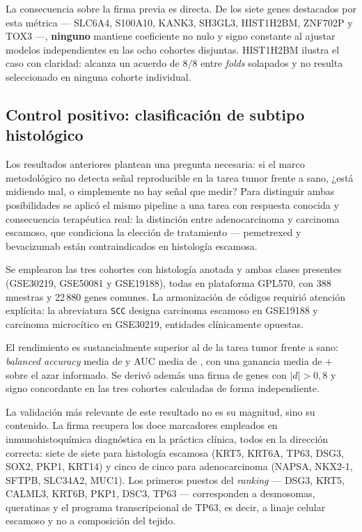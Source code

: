 La consecuencia sobre la firma previa es directa. De los siete genes destacados
por esta métrica --- SLC6A4, S100A10, KANK3, SH3GL3, HIST1H2BM, ZNF702P y
TOX3 ---, \textbf{ninguno} mantiene coeficiente no nulo y signo constante al
ajustar modelos independientes en las ocho cohortes disjuntas. HIST1H2BM
ilustra el caso con claridad: alcanza un acuerdo de $8/8$ entre \emph{folds}
solapados y no resulta seleccionado en ninguna cohorte individual.

\subsection{Control positivo: clasificación de subtipo histológico}
\label{sec:subtipo}

Los resultados anteriores plantean una pregunta necesaria: si el marco
metodológico no detecta señal reproducible en la tarea tumor frente a sano,
¿está midiendo mal, o simplemente no hay señal que medir? Para distinguir ambas
posibilidades se aplicó el mismo pipeline a una tarea con respuesta conocida y
consecuencia terapéutica real: la distinción entre adenocarcinoma y carcinoma
escamoso, que condiciona la elección de tratamiento --- pemetrexed y
bevacizumab están contraindicados en histología escamosa.

Se emplearon las tres cohortes con histología anotada y ambas clases presentes
(GSE30219, GSE50081 y GSE19188), todas en plataforma GPL570, con 388 muestras y
22\,880 genes comunes. La armonización de códigos requirió atención explícita:
la abreviatura \texttt{SCC} designa carcinoma escamoso en GSE19188 y carcinoma
microcítico en GSE30219, entidades clínicamente opuestas.



El rendimiento es sustancialmente superior al de la tarea tumor frente a sano:
\emph{balanced accuracy} media de \balaccsub{} y AUC media de \aucsub{}, con una ganancia
media de $+$\gananciasub{} sobre el azar informado. Se derivó además una firma de \ngenesfirma{}
genes con $|d|>0{,}8$ y signo concordante en las tres cohortes calculadas de
forma independiente.

La validación más relevante de este resultado no es su magnitud, sino su
contenido. La firma recupera los doce marcadores empleados en inmunohistoquímica
diagnóstica en la práctica clínica, todos en la dirección correcta: siete de
siete para histología escamosa (KRT5, KRT6A, TP63, DSG3, SOX2, PKP1, KRT14) y
cinco de cinco para adenocarcinoma (NAPSA, NKX2-1, SFTPB, SLC34A2, MUC1). Los
primeros puestos del \emph{ranking} --- DSG3, KRT5, CALML3, KRT6B, PKP1, DSC3,
TP63 --- corresponden a desmosomas, queratinas y el programa transcripcional de
TP63, es decir, a linaje celular escamoso y no a composición del tejido.

